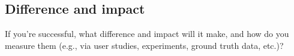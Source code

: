 \subsection{Difference and impact}
If you're successful, what difference and impact will it make, and how do you measure them (e.g., via user studies, experiments, ground truth data, etc.)?


